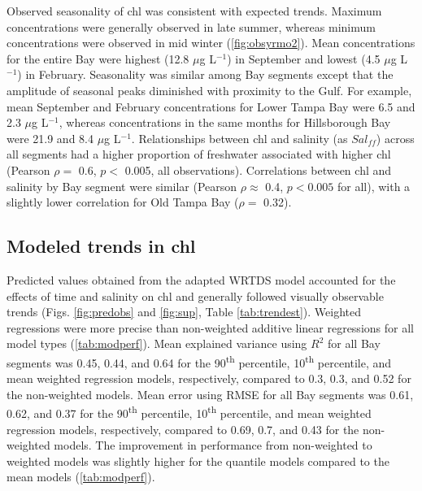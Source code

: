 \documentclass{svjour3}\usepackage[]{graphicx}\usepackage[]{color}
\newcommand{\mugl}{$\mu$g L$^{-1}$}
\begin{document}
Observed seasonality of \ac{chl} was consistent with expected trends.  Maximum concentrations were generally observed in late summer, whereas minimum concentrations were observed in mid winter (\cref{fig:obsyrmo2}).  Mean concentrations for the entire Bay were highest (12.8 \mugl) in September and lowest (4.5 \mugl) in February.  Seasonality was similar among Bay segments except that the amplitude of seasonal peaks diminished with proximity to the Gulf.  For example, mean September and February concentrations for Lower Tampa Bay were 6.5 and 2.3 \mugl, whereas concentrations in the same months for Hillsborough Bay were 21.9 and 8.4 \mugl.  Relationships between \ac{chl} and salinity (as $Sal_{ff}$) across all segments had a higher proportion of freshwater associated with higher \ac{chl} (Pearson $\rho=$ 0.6, $p<$ 0.005, all observations).  Correlations between \ac{chl} and salinity by Bay segment were similar (Pearson $\rho \approx$ 0.4, $p<0.005$ for all), with a slightly lower correlation for Old Tampa Bay ($\rho=$ 0.32).

\subsection{Modeled trends in \acl{chl}}

Predicted values obtained from the adapted \ac{WRTDS} model accounted for the effects of time and salinity on \ac{chl} and generally followed visually observable trends (Figs. \ref{fig:predobs} and \ref{fig:sup}, Table \ref{tab:trendest}).  Weighted regressions were more precise than non-weighted additive linear regressions for all model types (\cref{tab:modperf}).   Mean explained variance using $R^2$ for all Bay segments was 0.45, 0.44, and 0.64 for the 90\textsuperscript{th} percentile, 10\textsuperscript{th} percentile, and mean weighted regression models, respectively, compared to 0.3, 0.3, and 0.52 for the non-weighted models.  Mean error using \ac{RMSE} for all Bay segments was 0.61, 0.62, and 0.37 for the 90\textsuperscript{th} percentile, 10\textsuperscript{th} percentile, and mean weighted regression models, respectively, compared to 0.69, 0.7, and 0.43 for the non-weighted models.  The improvement in performance from non-weighted to weighted models was slightly higher for the quantile models compared to the mean models (\cref{tab:modperf}).    
\end{document}
